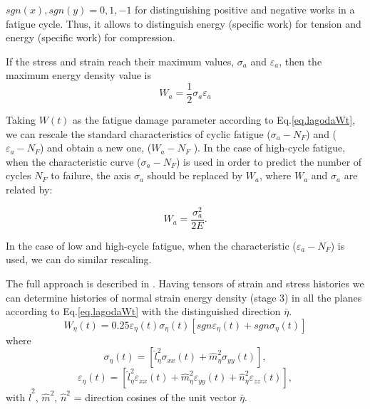 $sgn(x),sgn(y)=0,1,-1$ for distinguishing positive and negative works in a
fatigue cycle. Thus, it allows
to distinguish energy (specific work) for tension and
energy (specific work) for compression. 

If the stress and strain reach their maximum values,
$\sigma_a$ and $\varepsilon_a$, then the maximum energy density value is
\begin{equation}
W_a=\frac{1}{2}\sigma_a\varepsilon_a
\label{eq.lagodaWa}
\end{equation}

Taking $W(t)$ as the fatigue damage parameter according to Eq.\eqref{eq.lagodaWt}, we can rescale the standard characteristics of cyclic fatigue ($\sigma_a-N_F$) and ($\varepsilon_a-N_F$) and obtain a new one, ($W_a-N_F$ ). In the case of high-cycle fatigue, when the characteristic curve ($\sigma_a-N_F$) is used in order to predict the number of cycles $N_F$ to failure, the axis $\sigma_a$ should be replaced by $W_a$, where $W_a$ and $\sigma_a$ are related by:

$$W_a=\frac{\sigma_a^2}{2E}.$$

In the case of low and high-cycle fatigue, when the
characteristic ($\varepsilon_a-N_F$) is used, we can do similar rescaling. 
%
%
%

The full approach is described in . Having tensors of strain and stress histories we can
determine histories of normal strain energy density (stage
3) in all the planes according to Eq.\eqref{eq.lagodaWt} with the distinguished direction $\bar{\eta}$.
\begin{equation}
W_{\eta}(t)=0.25\varepsilon_\eta(t)\sigma_\eta(t)[sgn\varepsilon_\eta(t)+sgn\sigma_\eta(t)]
\label{eq.lagodaWeta}
\end{equation}
where
\begin{equation}
\sigma_\eta(t)=[\hat{l}^2_\eta\sigma_{xx}(t)+\hat{m}^2_\eta\sigma_{yy}(t)],
\label{eq.lagodasigeta}
\end{equation}
\begin{equation}\varepsilon_\eta(t)=[\hat{l}^2_\eta\varepsilon_{xx}(t)+\hat{m}^2_\eta\varepsilon_{yy}(t)+\hat{n}^2_\eta\varepsilon_{zz}(t)],\label{eq.lagodavareta}
\end{equation}
with $\hat{l}^2$, $\hat{m}^2$, $\hat{n}^2$ = direction cosines of the unit vector $\bar{\eta}$.

